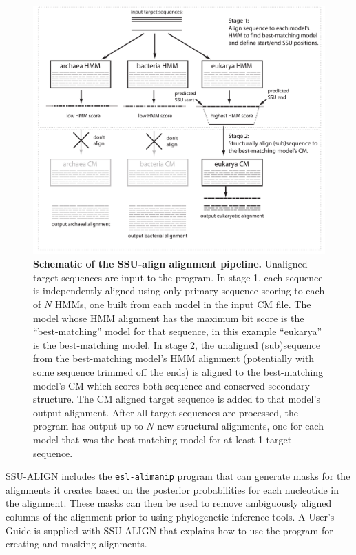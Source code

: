 \begin{figure}
  \begin{center}
\includegraphics[width=6.5in]{Figures/ssualign-schematic}
        \caption[Schematic of the SSU-ALIGN alignment
          pipeline]{\textbf{Schematic of the SSU-align
          alignment pipeline.} Unaligned target sequences are input to
        the program. In stage 1, each sequence is independently
        aligned using only primary sequence scoring to each of $N$
        HMMs, one built from each model in the input CM file. The
        model whose HMM alignment has the maximum bit score is the
        ``best-matching'' model for that sequence, in this example
        ``eukarya'' is the best-matching model. In stage 2, the
        unaligned (sub)sequence from the best-matching model's HMM
        alignment (potentially with some sequence trimmed off the
        ends) is aligned to the best-matching model's CM which scores
        both sequence and conserved secondary structure. The CM
        aligned target sequence is added to that model's output
        alignment. After all target sequences are processed, the
        program has output up to $N$ new structural alignments, one
        for each model that was the best-matching model for at least 1
        target sequence.}
  \end{center}
\label{fig:ssualign}
\end{figure}

SSU-ALIGN includes the {\tt esl-alimanip} program that can
generate masks for the alignments it creates based on the posterior
probabilities for each nucleotide in the alignment. These masks can then
be used to remove ambiguously aligned columns of the alignment prior
to using phylogenetic inference tools. %
A User's Guide is supplied with SSU-ALIGN that
explains how to use the program for creating and masking alignments.

